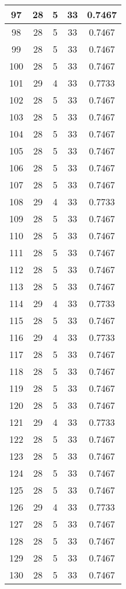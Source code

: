 \documentclass[letterpaper, 12pt]{article}
\begin{document}
\begin{longtable}{|c|c|c|c|c|}
\hline
97 & 28 & 5 & 33 & 0.7467 \\
\hline
98 & 28 & 5 & 33 & 0.7467 \\
\hline
99 & 28 & 5 & 33 & 0.7467 \\
\hline
100 & 28 & 5 & 33 & 0.7467 \\
\hline
101 & 29 & 4 & 33 & 0.7733 \\
\hline
102 & 28 & 5 & 33 & 0.7467 \\
\hline
103 & 28 & 5 & 33 & 0.7467 \\
\hline
104 & 28 & 5 & 33 & 0.7467 \\
\hline
105 & 28 & 5 & 33 & 0.7467 \\
\hline
106 & 28 & 5 & 33 & 0.7467 \\
\hline
107 & 28 & 5 & 33 & 0.7467 \\
\hline
108 & 29 & 4 & 33 & 0.7733 \\
\hline
109 & 28 & 5 & 33 & 0.7467 \\
\hline
110 & 28 & 5 & 33 & 0.7467 \\
\hline
111 & 28 & 5 & 33 & 0.7467 \\
\hline
112 & 28 & 5 & 33 & 0.7467 \\
\hline
113 & 28 & 5 & 33 & 0.7467 \\
\hline
114 & 29 & 4 & 33 & 0.7733 \\
\hline
115 & 28 & 5 & 33 & 0.7467 \\
\hline
116 & 29 & 4 & 33 & 0.7733 \\
\hline
117 & 28 & 5 & 33 & 0.7467 \\
\hline
118 & 28 & 5 & 33 & 0.7467 \\
\hline
119 & 28 & 5 & 33 & 0.7467 \\
\hline
120 & 28 & 5 & 33 & 0.7467 \\
\hline
121 & 29 & 4 & 33 & 0.7733 \\
\hline
122 & 28 & 5 & 33 & 0.7467 \\
\hline
123 & 28 & 5 & 33 & 0.7467 \\
\hline
124 & 28 & 5 & 33 & 0.7467 \\
\hline
125 & 28 & 5 & 33 & 0.7467 \\
\hline
126 & 29 & 4 & 33 & 0.7733 \\
\hline
127 & 28 & 5 & 33 & 0.7467 \\
\hline
128 & 28 & 5 & 33 & 0.7467 \\
\hline
129 & 28 & 5 & 33 & 0.7467 \\
\hline
130 & 28 & 5 & 33 & 0.7467 \\

\end{longtable}
\end{document}
